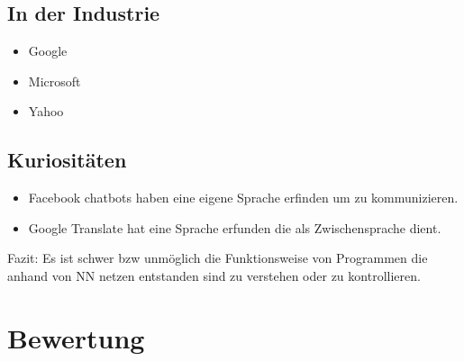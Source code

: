 \documentclass{article}
\begin{document}
\subsection{In der Industrie}
\begin{itemize}
	\item Google
	\item Microsoft
	\item Yahoo
\end{itemize}
\subsection{Kuriositäten}
\begin{itemize}
	\item Facebook chatbots haben eine eigene Sprache erfinden um zu kommunizieren.
	\item Google Translate hat eine Sprache erfunden die als Zwischensprache dient.
\end{itemize}
Fazit: Es ist schwer bzw unmöglich die Funktionsweise von Programmen die anhand von NN netzen entstanden sind zu verstehen oder zu kontrollieren.
\section{Bewertung}
	
\end{document}
